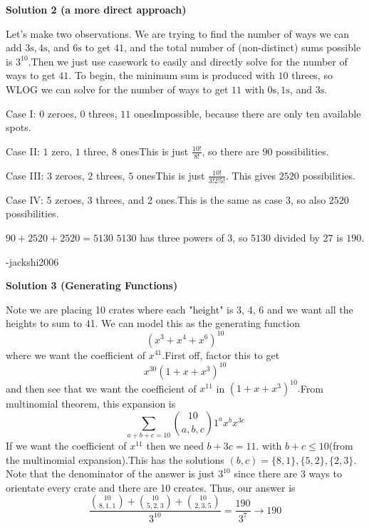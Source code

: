 \begin{enumerate}
 



\textbf{Solution 2 (a more direct approach)}

Let's make two observations. We are trying to find the number of ways we can add $3\text{s}, 4\text{s}$, and $6\text{s}$ to get $41$, and the total number of (non-distinct) sums possible is $3^{10}$.Then we just use casework to easily and directly solve for the number of ways to get $41$. To begin, the minimum sum is produced with $10$ threes, so WLOG we can solve for the number of ways to get $11$ with $0\text{s}, 1\text{s}$, and $3\text{s}$. 

 Case I: $0$ zeroes, $0$ threes, $11$ onesImpossible, because there are only ten available spots.

 Case II: $1$ zero, $1$ three, $8$ onesThis is just $\frac{10!}{8!}$, so there are $90$ possibilities.

 Case III: $3$ zeroes, $2$ threes, $5$ onesThis is just $\frac{10!}{3!2!5!}$. This gives $2520$ possibilities.

 Case IV: 5 zeroes, 3 threes, and 2 ones.This is the same as case $3$, so also $2520$ possibilities.

 $90+2520+2520=5130$
$5130$ has three powers of $3$, so $5130$ divided by $27$ is $\boxed{190}$.

 -jackshi2006

 



\textbf{Solution 3 (Generating Functions)}

Note we are placing 10 crates where each "height" is 3, 4, 6 and we want all the heights to sum to 41. We can model this as the generating function 
 \[\left(x^3+x^4+x^6\right)^{10}\] where we want the coefficient of $x^{41}.$First off, factor this to get 
 \[{x^{30} \left(1 + x + x^3\right)^{10}}\] and then see that we want the coefficient of $x^{11}$ in $\left(1+x+x^3\right)^{10}.$From multinomial theorem, this expansion is 
 \[\sum_{a+b+c=10}\binom{10}{a,b,c}1^ax^bx^{3c}\]If we want the coefficient of $x^{11}$ then we need $b + 3c = 11.$ with $b + c \le 10$(from the multinomial expansion).This has the solutions $(b, c) = \{8, 1\}, \{5, 2\}, \{2, 3\}.$ Note that the denominator of the answer is just $3^{10}$ since there are 3 ways to orientate every crate and there are 10 creates. Thus, our answer is 
 \[\frac{\binom{10}{8,1,1} + \binom{10}{5,2,3} + \binom{10}{2,3,5}}{3^{10}} = \frac{190}{3^7} \rightarrow \boxed{190}\]




\end{enumerate}

